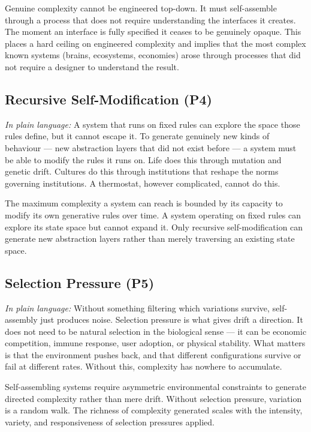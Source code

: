 \documentclass[12pt,a4paper]{article}
\begin{document}
Genuine complexity cannot be engineered top-down.
It must self-assemble through a process that does not require
understanding the interfaces it creates.
The moment an interface is fully specified it ceases to be genuinely
opaque.
This places a hard ceiling on engineered complexity and implies that
the most complex known systems (brains, ecosystems, economies) arose
through processes that did not require a designer to understand the
result.

\subsection{Recursive Self-Modification (P4)}

\textit{In plain language:} A system that runs on fixed rules can
explore the space those rules define, but it cannot escape it.
To generate genuinely new kinds of behaviour — new abstraction layers
that did not exist before — a system must be able to modify the rules
it runs on.
Life does this through mutation and genetic drift.
Cultures do this through institutions that reshape the norms governing
institutions.
A thermostat, however complicated, cannot do this.

The maximum complexity a system can reach is bounded by its capacity
to modify its own generative rules over time.
A system operating on fixed rules can explore its state space but
cannot expand it.
Only recursive self-modification can generate new abstraction layers
rather than merely traversing an existing state space.

\subsection{Selection Pressure (P5)}

\textit{In plain language:} Without something filtering which variations
survive, self-assembly just produces noise.
Selection pressure is what gives drift a direction.
It does not need to be natural selection in the biological sense —
it can be economic competition, immune response, user adoption, or
physical stability. What matters is that the environment pushes back,
and that different configurations survive or fail at different rates.
Without this, complexity has nowhere to accumulate.

Self-assembling systems require asymmetric environmental constraints
to generate directed complexity rather than mere drift.
Without selection pressure, variation is a random walk.
The richness of complexity generated scales with the intensity,
variety, and responsiveness of selection pressures applied.
\end{document}

